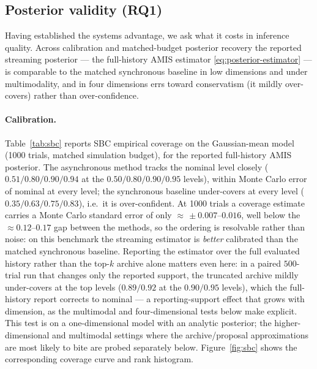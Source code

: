 \subsection{Posterior validity (RQ1)}\label{sec:results-validity}
Having established the systems advantage, we ask what it costs in inference quality. Across calibration and matched-budget posterior recovery the reported streaming posterior --- the full-history AMIS estimator \eqref{eq:posterior-estimator} --- is comparable to the matched synchronous baseline in low dimensions and under multimodality, and in four dimensions errs toward conservatism (it mildly over-covers) rather than over-confidence.

\paragraph{Calibration.} Table~\ref{tab:sbc} reports SBC empirical coverage on the Gaussian-mean model (1000 trials, matched simulation budget), for the reported full-history AMIS posterior. The asynchronous method tracks the nominal level closely ($0.51/0.80/0.90/0.94$ at the $0.50/0.80/0.90/0.95$ levels), within Monte Carlo error of nominal at every level; the synchronous baseline under-covers at every level ($0.35/0.63/0.75/0.83$), i.e.\ it is over-confident. At 1000 trials a coverage estimate carries a Monte Carlo standard error of only ${\approx}\,\pm0.007$--$0.016$, well below the ${\approx}0.12$--$0.17$ gap between the methods, so the ordering is resolvable rather than noise: on this benchmark the streaming estimator is \emph{better} calibrated than the matched synchronous baseline. Reporting the estimator over the full evaluated history rather than the top-$k$ archive alone matters even here: in a paired $500$-trial run that changes only the reported support, the truncated archive mildly under-covers at the top levels ($0.89/0.92$ at the $0.90/0.95$ levels), which the full-history report corrects to nominal --- a reporting-support effect that grows with dimension, as the multimodal and four-dimensional tests below make explicit. This test is on a one-dimensional model with an analytic posterior; the higher-dimensional and multimodal settings where the archive/proposal approximations are most likely to bite are probed separately below. Figure~\ref{fig:sbc} shows the corresponding coverage curve and rank histogram.

